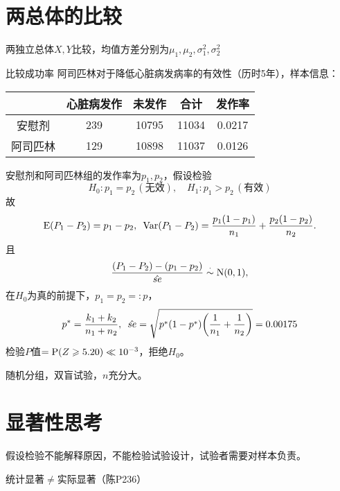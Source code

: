 \section{两总体的比较}
两独立总体$X,Y$比较，均值方差分别为$\mu_1,\mu_2,\sigma_1^2,\sigma_2^2$

\begin{example}{比较成功率}{}
	阿司匹林对于降低心脏病发病率的有效性（历时5年），样本信息：
	\begin{center}
		\begin{tabular}{c|cccc}
			\toprule
			&心脏病发作&未发作&合计&发作率\\
			\midrule
			安慰剂&239&10795&11034&0.0217\\
			阿司匹林&129&10898&11037&0.0126\\
			\bottomrule
		\end{tabular}
	\end{center}
	安慰剂和阿司匹林组的发作率为$p_1,p_2$，假设检验 
	\[
		H_0:p_1=p_2\,(\text{无效}),\quad H_1:p_1>p_2\,(\text{有效})
	\]
	故
	\[
		\E(P_1-P_2)=p_1-p_2,\enspace\Var(P_1-P_2)=\frac{p_1(1-p_1)}{n_1}+\frac{p_2(1-p_2)}{n_2}.
	\]
	且
	\[
		\frac{(P_1-P_2)-(p_1-p_2)}{\hat{se}}\dotsim\Norm(0,1),
	\]
	在$H_0$为真的前提下，$p_1=p_2=:p$，
	\begin{align*}
		p^\ast=\frac{k_1+k_2}{n_1+n_2},\enspace\hat{se}=\sqrt{p^\ast(1-p^\ast)\biggkh{\frac1{n_1}+\frac1{n_2}}}=0.00175
	\end{align*}
	检验$P$值$=\P(Z\geqslant 5.20)\ll 10^{-3}$，拒绝$H_0$。
\end{example}
\begin{remark}
	随机分组，双盲试验，$n$充分大。
\end{remark}

\section{显著性思考}
假设检验不能解释原因，不能检验试验设计，试验者需要对样本负责。

统计显著$\neq$实际显著（陈P236）